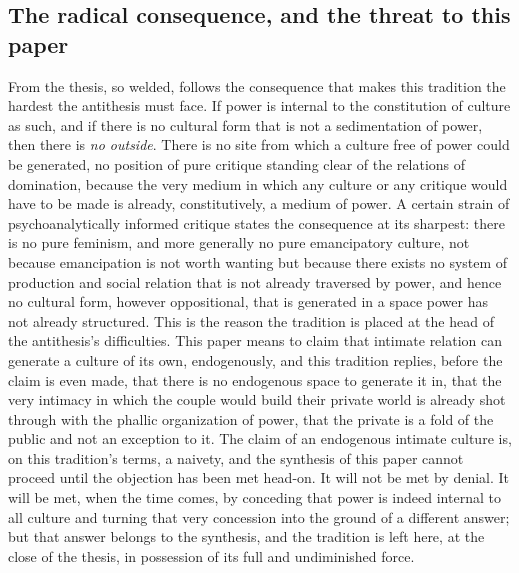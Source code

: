 \subsection*{The radical consequence, and the threat to this paper}

From the thesis, so welded, follows the consequence that makes this tradition the hardest the antithesis must face. If power is internal to the constitution of culture as such, and if there is no cultural form that is not a sedimentation of power, then there is \emph{no outside}. There is no site from which a culture free of power could be generated, no position of pure critique standing clear of the relations of domination, because the very medium in which any culture or any critique would have to be made is already, constitutively, a medium of power. A certain strain of psychoanalytically informed critique states the consequence at its sharpest: there is no pure feminism, and more generally no pure emancipatory culture, not because emancipation is not worth wanting but because there exists no system of production and social relation that is not already traversed by power, and hence no cultural form, however oppositional, that is generated in a space power has not already structured. This is the reason the tradition is placed at the head of the antithesis's difficulties. This paper means to claim that intimate relation can generate a culture of its own, endogenously, and this tradition replies, before the claim is even made, that there is no endogenous space to generate it in, that the very intimacy in which the couple would build their private world is already shot through with the phallic organization of power, that the private is a fold of the public and not an exception to it. The claim of an endogenous intimate culture is, on this tradition's terms, a naivety, and the synthesis of this paper cannot proceed until the objection has been met head-on. It will not be met by denial. It will be met, when the time comes, by conceding that power is indeed internal to all culture and turning that very concession into the ground of a different answer; but that answer belongs to the synthesis, and the tradition is left here, at the close of the thesis, in possession of its full and undiminished force.
